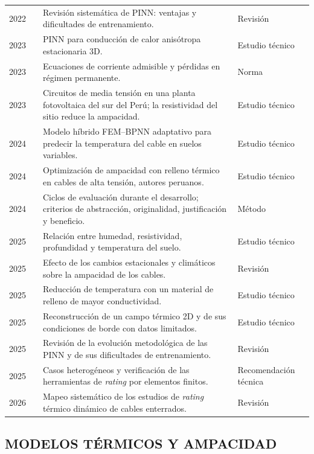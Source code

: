 \begin{longtable}{L{1.1cm}L{3.4cm}L{7.6cm}L{2.4cm}}
2022 & \textcite{lawal2022} & Revisión sistemática de PINN: ventajas y dificultades de entrenamiento. & Revisión \\
2023 & \textcite{xing2023} & PINN para conducción de calor anisótropa estacionaria 3D. & Estudio técnico \\
2023 & \textcite{iec60287} & Ecuaciones de corriente admisible y pérdidas en régimen permanente. & Norma \\
2023 & \textcite{ariasVelasquez2023} & Circuitos de media tensión en una planta fotovoltaica del sur del Perú; la resistividad del sitio reduce la ampacidad. & Estudio técnico \\
2024 & \textcite{aldulaimi2024} & Modelo híbrido FEM--BPNN adaptativo para predecir la temperatura del cable en suelos variables. & Estudio técnico \\
2024 & \textcite{atoccsa2024} & Optimización de ampacidad con relleno térmico en cables de alta tensión, autores peruanos. & Estudio técnico \\
2024 & \textcite{delport2024} & Ciclos de evaluación durante el desarrollo; criterios de abstracción, originalidad, justificación y beneficio. & Método \\
2025 & \textcite{khumalo2025} & Relación entre humedad, resistividad, profundidad y temperatura del suelo. & Estudio técnico \\
2025 & \textcite{mobius2025} & Efecto de los cambios estacionales y climáticos sobre la ampacidad de los cables. & Revisión \\
2025 & \textcite{kim2025} & Reducción de temperatura con un material de relleno de mayor conductividad. & Estudio técnico \\
2025 & \textcite{pan2025} & Reconstrucción de un campo térmico 2D y de sus condiciones de borde con datos limitados. & Estudio técnico \\
2025 & \textcite{ren2025} & Revisión de la evolución metodológica de las PINN y de sus dificultades de entrenamiento. & Revisión \\
2025 & \textcite{cigre2025} & Casos heterogéneos y verificación de las herramientas de \textit{rating} por elementos finitos. & Recomendación técnica \\
2026 & \textcite{fariz2026} & Mapeo sistemático de los estudios de \textit{rating} térmico dinámico de cables enterrados. & Revisión \\
\bottomrule
\end{longtable}\endgroup

\subsection{MODELOS TÉRMICOS Y AMPACIDAD}

